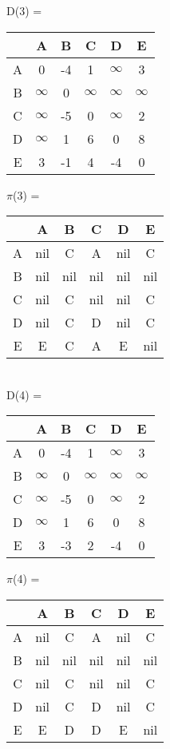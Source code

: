 \documentclass{article}
\begin{document}
D(3) = 
\begin{tabular}{ c | c | c | c | c | c }        
    
    & A & B & C & D & E \\ 
    \hline
  A & 0 & -4 & 1 & $\infty$ & 3 \\  
    \hline
  B & $\infty$ & 0 & $\infty$ & $\infty$ & $\infty$ \\
    \hline
  C & $\infty$ & -5 & 0 & $\infty$ & 2 \\
    \hline
  D & $\infty$ & 1 & 6 & 0 & 8 \\     
    \hline
  E & 3 & -1 & 4 & -4 & 0 \\

\end{tabular}
${\pi}$(3) =
\begin{tabular}{ c | c | c | c | c | c }        
    
    & A & B & C & D & E \\ 
    \hline
  A & nil & C & A & nil & C \\  
    \hline
  B & nil & nil & nil & nil & nil \\
    \hline
  C & nil & C & nil & nil & C \\
    \hline
  D & nil & C & D & nil & C \\     
    \hline
  E & E & C & A & E & nil \\

\end{tabular}\\

D(4) = 
\begin{tabular}{ c | c | c | c | c | c }        
    
    & A & B & C & D & E \\ 
    \hline
  A & 0 & -4 & 1 & $\infty$ & 3 \\  
    \hline
  B & $\infty$ & 0 & $\infty$ & $\infty$ & $\infty$ \\
    \hline
  C & $\infty$ & -5 & 0 & $\infty$ & 2 \\
    \hline
  D & $\infty$ & 1 & 6 & 0 & 8 \\     
    \hline
  E & 3 & -3 & 2 & -4 & 0 \\

\end{tabular}
${\pi}$(4) =
\begin{tabular}{ c | c | c | c | c | c }        
    
    & A & B & C & D & E \\ 
    \hline
  A & nil & C & A & nil & C \\  
    \hline
  B & nil & nil & nil & nil & nil \\
    \hline
  C & nil & C & nil & nil & C \\
    \hline
  D & nil & C & D & nil & C \\     
    \hline
  E & E & D & D & E & nil \\

\end{tabular}\\
\end{document}
